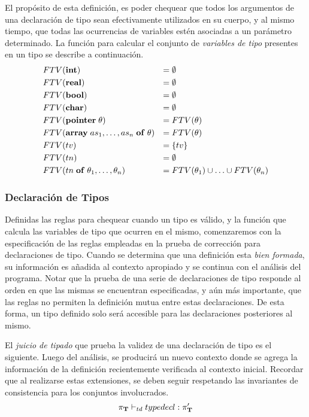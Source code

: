 El propósito de esta definición, es poder chequear que todos los argumentos de una declaración de tipo sean efectivamente utilizados en su cuerpo, y al mismo tiempo, que todas las ocurrencias de variables estén asociadas a un parámetro determinado.
La función para calcular el conjunto de \textit{variables de tipo} presentes en un tipo se describe a continuación.
\begin{align*}
&FTV(\mathbf{int})
&=&\;
\emptyset
\\
&FTV(\mathbf{real})
&=&\;
\emptyset
\\
&FTV(\mathbf{bool})
&=&\;
\emptyset
\\
&FTV(\mathbf{char})
&=&\;
\emptyset
\\
&FTV(\mathbf{pointer} \; \theta)
&=&\;
FTV(\theta)
\\
&FTV(\mathbf{array} \; as_1, \ldots, as_n \; \mathbf{of} \; \theta)
&=&\;
FTV(\theta)
\\
&FTV(tv)
&=&\;
\{ tv \}
\\
&FTV(tn)
&=&\;
\emptyset
\\
&FTV(tn \; \mathbf{of} \; \theta_1, \ldots, \theta_n)
&=&\;
FTV(\theta_1) \cup \ldots \cup FTV(\theta_n)
\end{align*}

\subsubsection{Declaración de Tipos}

Definidas las reglas para chequear cuando un tipo es válido, y la función que calcula las variables de tipo que ocurren en el mismo, comenzaremos con la especificación de las reglas empleadas en la prueba de corrección para declaraciones de tipo.
Cuando se determina que una definición esta \textit{bien formada}, su información es añadida al contexto apropiado y se continua con el análisis del programa.
Notar que la prueba de una serie de declaraciones de tipo responde al orden en que las mismas se encuentran especificadas, y aún más importante, que las reglas no permiten la definición mutua entre estas declaraciones.
De esta forma, un tipo definido solo será accesible para las declaraciones posteriores al mismo.

El \textit{juicio de tipado} que prueba la validez de una declaración de tipo es el siguiente.
Luego del análisis, se producirá un nuevo contexto donde se agrega la información de la definición recientemente verificada al contexto inicial.
Recordar que al realizarse estas extensiones, se deben seguir respetando las invariantes de consistencia para los conjuntos involucrados.
\begin{gather*}
\pi_{\mathbf{T}} \vdash_{td} typedecl : \pi_{\mathbf{T}}'
\end{gather*}

